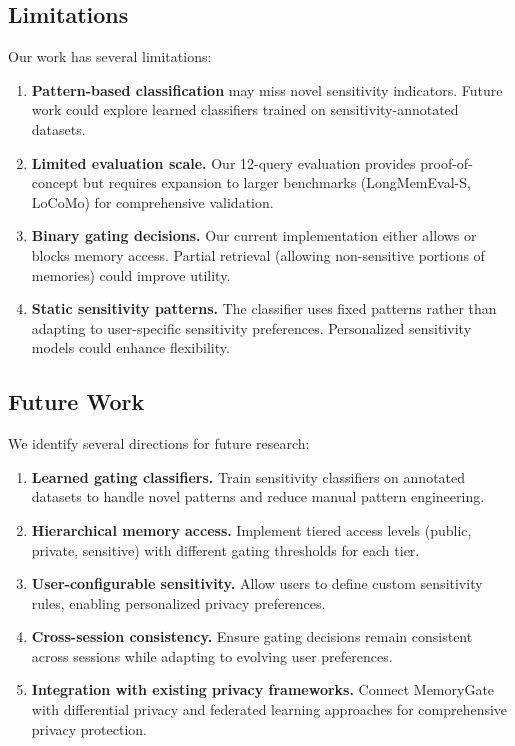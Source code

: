 \documentclass[conference]{IEEEtran}
\begin{document}
\subsection{Limitations}

Our work has several limitations:

\begin{enumerate}
    \item \textbf{Pattern-based classification} may miss novel sensitivity indicators. Future work could explore learned classifiers trained on sensitivity-annotated datasets.
    \item \textbf{Limited evaluation scale.} Our 12-query evaluation provides proof-of-concept but requires expansion to larger benchmarks (LongMemEval-S, LoCoMo) for comprehensive validation.
    \item \textbf{Binary gating decisions.} Our current implementation either allows or blocks memory access. Partial retrieval (allowing non-sensitive portions of memories) could improve utility.
    \item \textbf{Static sensitivity patterns.} The classifier uses fixed patterns rather than adapting to user-specific sensitivity preferences. Personalized sensitivity models could enhance flexibility.
\end{enumerate}

\subsection{Future Work}

We identify several directions for future research:

\begin{enumerate}
    \item \textbf{Learned gating classifiers.} Train sensitivity classifiers on annotated datasets to handle novel patterns and reduce manual pattern engineering.
    \item \textbf{Hierarchical memory access.} Implement tiered access levels (public, private, sensitive) with different gating thresholds for each tier.
    \item \textbf{User-configurable sensitivity.} Allow users to define custom sensitivity rules, enabling personalized privacy preferences.
    \item \textbf{Cross-session consistency.} Ensure gating decisions remain consistent across sessions while adapting to evolving user preferences.
    \item \textbf{Integration with existing privacy frameworks.} Connect MemoryGate with differential privacy and federated learning approaches for comprehensive privacy protection.
\end{enumerate}
\end{document}
